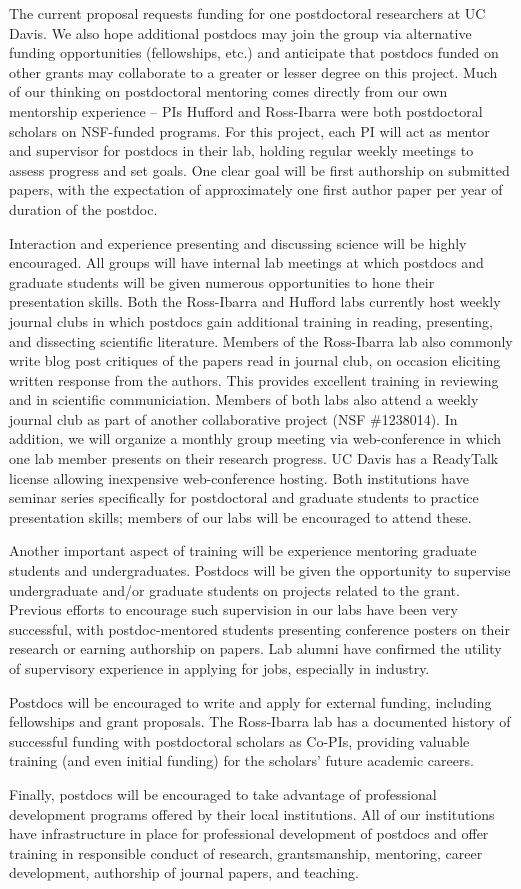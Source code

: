 The current proposal requests funding for one postdoctoral researchers at UC Davis. We also hope additional postdocs may join the group via alternative funding opportunities (fellowships, etc.) and anticipate that postdocs funded on other grants may collaborate to a greater or lesser degree on this project.  Much of our thinking on postdoctoral mentoring comes directly from our own mentorship experience -- PIs Hufford and Ross-Ibarra were both postdoctoral scholars on NSF-funded programs. For this project, each PI will act as mentor and supervisor for postdocs in their lab, holding regular weekly meetings to assess progress and set goals.  One clear goal will be first authorship on submitted papers, with the expectation of approximately one first author paper per year of duration of the postdoc. 

Interaction and experience presenting and discussing science will be highly encouraged. All groups will have internal lab meetings at which postdocs and graduate students will be given numerous opportunities to hone their presentation skills.  Both the Ross-Ibarra and Hufford labs currently host weekly journal clubs in which postdocs gain additional training in reading, presenting, and dissecting scientific literature. Members of the Ross-Ibarra lab also commonly write blog post critiques of the papers read in journal club, on occasion eliciting written response from the authors.  This provides excellent training in reviewing and in scientific communiciation.  Members of both labs also attend a weekly journal club as part of another collaborative project (NSF \#1238014). In addition, we will organize a monthly group meeting via web-conference in which one lab member presents on their research progress.  UC Davis has a ReadyTalk license allowing inexpensive web-conference hosting. Both institutions have seminar series specifically for postdoctoral and graduate students to practice presentation skills; members of our labs will be encouraged to attend these.

Another important aspect of training will be experience mentoring graduate students and undergraduates.  Postdocs will be given the opportunity to supervise undergraduate and/or graduate students on projects related to the grant.  Previous efforts to encourage such supervision in our labs have been very successful, with postdoc-mentored students presenting conference posters on their research or earning authorship on papers.  Lab alumni have confirmed the utility of supervisory experience in applying for jobs, especially in industry.

Postdocs will be encouraged to write and apply for external funding, including fellowships and grant proposals.  The Ross-Ibarra lab has a documented history of successful funding with postdoctoral scholars as Co-PIs, providing valuable training (and even initial funding) for the scholars' future academic careers.

Finally, postdocs will be encouraged to take advantage of professional development programs offered by their local institutions. All of our institutions have infrastructure in place for professional development of postdocs and offer training in responsible conduct of research, grantsmanship, mentoring, career development, authorship of journal papers, and teaching.